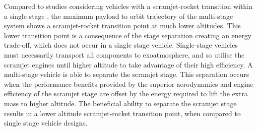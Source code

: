 \documentclass[journal]{new-aiaa}
\begin{document}
 
 Compared to studies considering vehicles with a scramjet-rocket transition within a single stage \cite{Lu1993}\cite{Trefny1999}, the maximum payload to orbit trajectory of the multi-stage system shows a scramjet-rocket transition point at much lower altitudes.
 This lower transition point is a consequence of the stage separation creating an energy trade-off, which does not occur in a single stage vehicle. Single-stage vehicles must necessarily transport all components to exoatmosphere, and so utilise the scramjet engines until higher altitude to take advantage of their high efficiency. A multi-stage vehicle is able to separate the scramjet stage. 
This separation occurs when the performance benefits provided by the superior aerodynamics and engine efficiency of the scramjet stage are offset by the energy required to lift the extra mass to higher altitude. The beneficial ability
to separate the scramjet stage results in a lower altitude scramjet-rocket transition point, when compared to single
stage vehicle designs.
\end{document}
